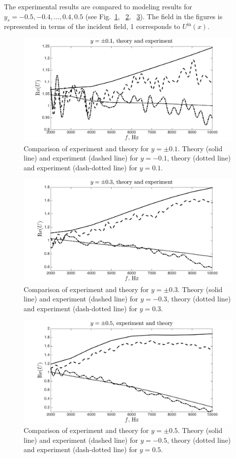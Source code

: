 \documentclass{procDDs}
\begin{document}
The experimental results are compared to modeling results for $y_s = -0.5, -0.4,..., 0.4, 0.5$ (see Fig.~\ref{y01}, ~\ref{y03}, ~\ref{y05}). The field in the figures is represented in terms of the incident field, 1 corresponds to $U^{\text{in}}(x)$.

\begin{figure}[t!]\centering
	\includegraphics[width=.51\textwidth]{y01.jpg}
	\caption{Comparison of experiment and theory for $y = \pm 0.1$. Theory (solid line) and experiment (dashed line) for $y = -0.1$, theory (dotted line) and experiment (dash-dotted line) for $y = 0.1$.}\label{y01}
\end{figure}

\begin{figure}[t!]\centering
	\includegraphics[width=.51\textwidth]{y03.jpg}
	\caption{Comparison of experiment and theory for $y = \pm 0.3$. Theory (solid line) and experiment (dashed line) for $y = -0.3$, theory (dotted line) and experiment (dash-dotted line) for $y = 0.3$.}\label{y03}
\end{figure}

\begin{figure}[t!]\centering
	\includegraphics[width=.51\textwidth]{y05.jpg}
	\caption{Comparison of experiment and theory for $y = \pm 0.5$. Theory (solid line) and experiment (dashed line) for $y = -0.5$, theory (dotted line) and experiment (dash-dotted line) for $y = 0.5$.}\label{y05}
\end{figure}
\end{document}

